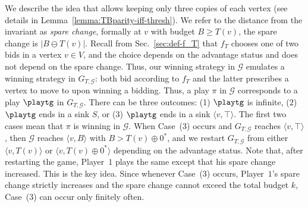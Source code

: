 \documentclass{theoretics}
\newcommand{\PO}{Player~$1$\xspace}
\newcommand{\G}{{\mathcal G}}
\newcommand{\zug}[1]{\langle #1  \rangle}
\newcommand{\succb}[1]{#1 \oplus 0^*\xspace}
\begin{document}
We describe the idea that allows keeping only three copies of each vertex (see details in Lemma~\ref{lemma:TBparity-iff-thresh}). 
We refer to the distance from the invariant as {\em spare change}, formally at $v$ with budget $B \geq T(v)$, the spare change is \(|B \ominus T(v)|\). 
Recall from Sec.~\ref{sec:def-f_T} that $f_T$ chooses one of two bids in a vertex $v \in V$, and the choice depends on the advantage status and does not depend on the spare change. Thus, our winning strategy in $\G$ emulates a winning strategy in $G_{T,\G}$: both bid according to $f_T$ and the latter prescribes a vertex to move to upon winning a bidding. Thus, a play $\pi$ in $\G$ corresponds to a play $\playtg$ in $G_{T,\G}$.
There can be three outcomes: (1) $\playtg$ is infinite, (2) $\playtg$ ends in a sink $S$, or (3) $\playtg$ ends in a sink $\zug{v,\top}$. The first two cases mean that $\pi$ is winning in $\G$. When Case~(3) occurs and $G_{T, \G}$ reaches $\zug{v, \top}$, then $\G$ reaches $\zug{v, B}$ with $B > \succb{T(v)}$, and we restart $G_{T, \G}$ from either $\zug{v, T(v)}$ or $\zug{v, \succb{T(v)}}$ depending on the advantage status. Note that, after restarting the game, \PO plays the same except that his spare change increased. 
This is the key idea. Since whenever Case~(3) occurs, \PO's spare change strictly increases and the spare change cannot exceed the total budget $k$, Case~(3) can occur only finitely often.
\end{document}
